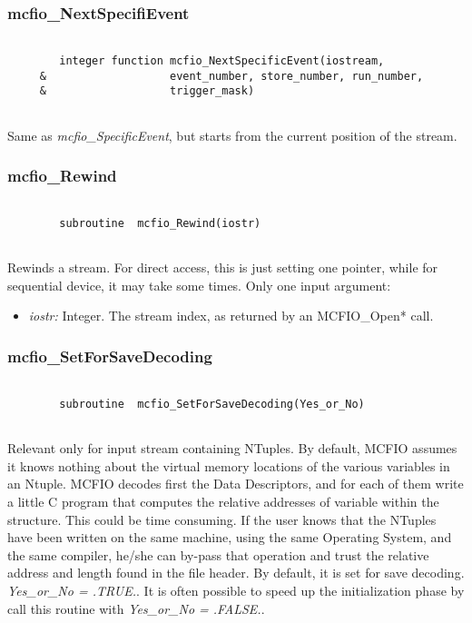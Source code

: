 \subsubsection{mcfio\_NextSpecifiEvent}

\begin{verbatim}

        integer function mcfio_NextSpecificEvent(iostream, 
     &                   event_number, store_number, run_number, 
     &                   trigger_mask)
	
\end{verbatim}
Same as {\em mcfio\_SpecificEvent}, but starts from the current
position of the stream. 
	
\subsubsection{mcfio\_Rewind}

\begin{verbatim}

        subroutine  mcfio_Rewind(iostr)
    
\end{verbatim}

Rewinds a stream. For direct access, this is just setting 
one pointer, while for sequential device, it may take some 
times.  Only one input argument: 
\begin{itemize} 
\item {\em iostr:} Integer. The stream index, as returned by an MCFIO\_Open* 
call. 
\end{itemize}

\subsubsection{mcfio\_SetForSaveDecoding}

\begin{verbatim}

        subroutine  mcfio_SetForSaveDecoding(Yes_or_No)
    
\end{verbatim}

Relevant only for input stream containing NTuples. 
By default, MCFIO assumes it knows nothing about the virtual memory 
locations of the various variables in an Ntuple.  MCFIO decodes first the 
Data Descriptors, and for each of them write a little C program that 
computes the relative addresses of variable within the structure.  
This could be time consuming.  If the user knows that the NTuples have 
been written on the same machine, using the same Operating System, and the same 
compiler, he/she can by-pass that operation and trust the relative address and 
length found in the file header.  By default, it is set for save decoding. 
{\em Yes\_or\_No = .TRUE.}. It is often possible to speed up the initialization
phase by call this routine with  {\em Yes\_or\_No = .FALSE.}.   

